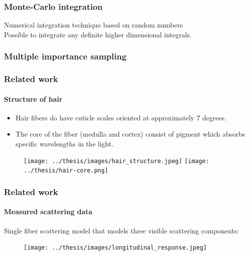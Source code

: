 \documentclass{beamer}
\begin{document}
  
  
  \begin{frame}
    \frametitle{Monte-Carlo integration}
    
    Numerical integration technique based on random numbers \\
    Possible to integrate any definite higher dimensional integrals.
  \end{frame}
  
  \begin{frame}
    \frametitle{Multiple importance sampling}
  \end{frame}

  
  \begin{frame}
    \frametitle{Related work}
	\framesubtitle{Structure of hair}
	
	\begin{itemize}
	\item Hair fibers do have cuticle scales oriented at approximately 7 degrees.
	\item The core of the fiber (medulla and cortex) consist of pigment which absorbs specific wavelengths in the light.
	\end{itemize}
	
	\begin{figure}
	\texttt{[image: ../thesis/images/hair\_structure.jpeg]}
	\texttt{[image: ../thesis/hair-core.png]}
	\end{figure}
  \end{frame}
  
  
  \begin{frame}
    \frametitle{Related work}
    \framesubtitle{Measured scattering data}
    Single fiber scattering model that models three visible scattering components:
    
    \begin{figure}
    \centering
    \texttt{[image: ../thesis/images/longitudinal\_response.jpeg]}
    \end{figure}
  \end{frame}
  
\end{document}
